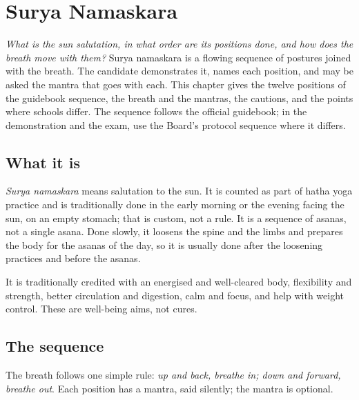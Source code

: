\chapter{Surya Namaskara}
\label{ch:surya-namaskara}

\emph{What is the sun salutation, in what order are its positions done, and how does the breath move with them?}
Surya namaskara is a flowing sequence of postures joined with the breath. The candidate demonstrates it, names each position, and may be asked the mantra that goes with each. This chapter gives the twelve positions of the guidebook sequence, the breath and the mantras, the cautions, and the points where schools differ. The sequence follows the official guidebook; in the demonstration and the exam, use the Board's protocol sequence where it differs.

\section{What it is}

\emph{Surya namaskara} means salutation to the sun. It is counted as part of hatha yoga practice and is traditionally done in the early morning or the evening facing the sun, on an empty stomach; that is custom, not a rule. It is a sequence of asanas, not a single asana. Done slowly, it loosens the spine and the limbs and prepares the body for the asanas of the day, so it is usually done after the loosening practices and before the asanas.

It is traditionally credited with an energised and well-cleared body, flexibility and strength, better circulation and digestion, calm and focus, and help with weight control. These are well-being aims, not cures.

\section{The sequence}

The breath follows one simple rule: \emph{up and back, breathe in; down and forward, breathe out}. Each position has a mantra, said silently; the mantra is optional.


